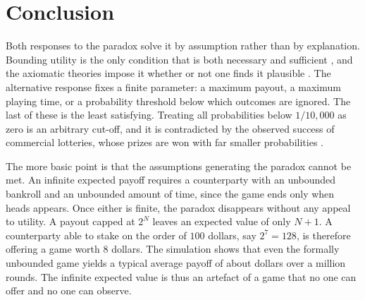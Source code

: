 \section{Conclusion}

Both responses to the paradox solve it by assumption rather than by explanation.
Bounding utility is the only condition that is both necessary and sufficient \citep{menger1934unbounded}, and the axiomatic theories impose it whether or not one finds it plausible \citep{fishburn1970utility}.
The alternative response fixes a finite parameter: a maximum payout, a maximum playing time, or a probability threshold below which outcomes are ignored.
The last of these is the least satisfying. Treating all probabilities below $1/10{,}000$ as zero is an arbitrary cut-off, and it is contradicted by the observed success of commercial lotteries, whose prizes are won with far smaller probabilities \citep{seidl2013meta}.

The more basic point is that the assumptions generating the paradox cannot be met.
An infinite expected payoff requires a counterparty with an unbounded bankroll and an unbounded amount of time, since the game ends only when heads appears.
Once either is finite, the paradox disappears without any appeal to utility.
A payout capped at $2^{N}$ leaves an expected value of only $N+1$.
A counterparty able to stake on the order of $100$ dollars, say $2^{7} = 128$, is therefore offering a game worth $8$ dollars.
The simulation shows that even the formally unbounded game yields a typical average payoff of about \simMedianEnd{} dollars over a million rounds.
The infinite expected value is thus an artefact of a game that no one can offer and no one can observe.